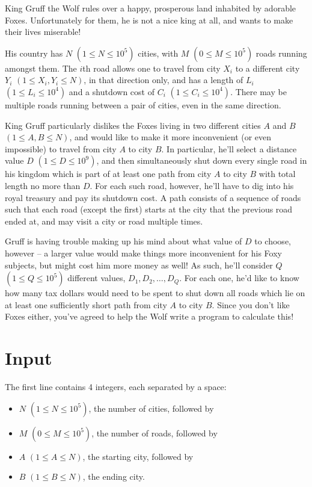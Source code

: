 King Gruff the Wolf rules over a happy, prosperous land inhabited by adorable Foxes. Unfortunately for them, he is not a nice king at all, and wants to make their lives miserable!

His country has $N$ $(1 \leq N \leq 10^5)$ cities, with $M$ $(0 \leq M \leq 10^5)$ roads running
amongst them. The $i$th road allows one to travel from city $X_i$ to a different city $Y_i$ $(1 \leq
X_i,Y_i \leq N)$, in that direction only, and has a length of $L_i$ $(1 \leq L_i \leq 10^4)$ and a
shutdown cost of $C_i$ $(1 \leq C_i \leq 10^4)$. There may be multiple roads running between a pair
of cities, even in the same direction.

King Gruff particularly dislikes the Foxes living in two different cities $A$ and $B$ $(1 \leq A,B
\leq N)$, and would like to make it more inconvenient (or even impossible) to travel from city $A$
to city $B$. In particular, he'll select a distance value $D$ $(1 \leq D \leq 10^9)$, and then
simultaneously shut down every single road in his kingdom which is part of at least one path from
city $A$ to city $B$ with total length no more than $D$. For each such road, however, he'll have to
dig into his royal treasury and pay its shutdown cost. A path consists of a sequence of roads such
that each road (except the first) starts at the city that the previous road ended at, and may visit
a city or road multiple times.

Gruff is having trouble making up his mind about what value of $D$ to choose, however -- a larger
value would make things more inconvenient for his Foxy subjects, but might cost him more money as
well! As such, he'll consider $Q$ $(1 \leq Q \leq 10^5)$ different values, $D_1, D_2, \ldots, D_Q$.
For each one, he'd like to know how many tax dollars would need to be spent to shut down all roads
which lie on at least one sufficiently short path from city $A$ to city $B$. Since you don't like
Foxes either, you've agreed to help the Wolf write a program to calculate this!

\section*{Input}
The first line contains 4 integers, each separated by a space:

\begin{itemize}
\item $N$ $(1 \leq N \leq 10^5)$, the number of cities, followed by
\item $M$ $(0 \leq M \leq 10^5)$, the number of roads, followed by
\item $A$ $(1 \leq A \leq N)$, the starting city, followed by
\item $B$ $(1 \leq B \leq N)$, the ending city.
\end{itemize}

